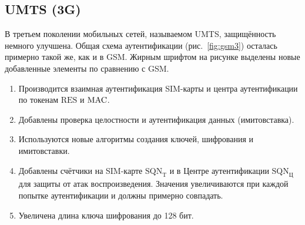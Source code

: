 \subsection{UMTS (3G)}

В третьем поколении мобильных сетей, называемом UMTS, защищённость немного улучшена. Общая схема аутентификации (рис.~\ref{fig:gsm3}) осталась примерно такой же, как и в GSM. Жирным шрифтом на рисунке выделены новые добавленные элементы по сравнению с GSM.
\begin{enumerate}
    \item Производится взаимная аутентификация SIM-карты и центра аутентификации по токенам $\textrm{RES}$ и $\textrm{MAC}$.
    \item Добавлены проверка целостности и аутентификация данных (имитовставка).
    \item Используются новые алгоритмы создания ключей, шифрования и имитовставки.
    \item Добавлены счётчики на SIM-карте $\textrm{SQN}_{\textrm{T}}$ и в Центре аутентификации $\textrm{SQN}_{\textrm{Ц}}$ для защиты от атак воспроизведения. Значения увеличиваются при каждой попытке аутентификации и должны примерно совпадать.
    \item Увеличена длина ключа шифрования до 128 бит.
\end{enumerate}

